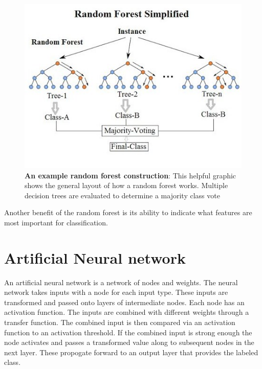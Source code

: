 \documentclass[twoside]{report}
\begin{document}
\begin{figure}[ht]
  \begin{center}
    \includegraphics[scale=0.8]{rand-forest.jpg}
    \caption{{\bf An example random forest construction}: This helpful graphic shows the general layout of how a random forest works. Multiple decision trees are evaluated to determine a majority class vote \cite{randforestgraphic}}
 \end{center}
\end{figure}

Another benefit of the random forest is its ability to indicate what features are most important for classification. 

\section{Artificial Neural network}
An artificial neural network is a network of nodes and weights. The neural network takes inputs with a node for each input type. These inputs are transformed and passed onto layers of intermediate nodes. Each node has an activation function. The inputs are combined with different weights through a transfer function. The combined input is then compared via an activation function to an activation threshold. If the combined input is strong enough the node activates and passes a transformed value along to subsequent nodes in the next layer. These propogate forward to an output layer that provides the labeled class. 
\end{document}
